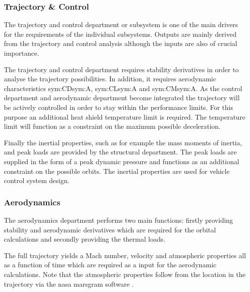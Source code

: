 \subsubsection{Trajectory \& Control}
The trajectory and control department or subsystem is one of the main drivers for the requirements of the individual subsystems. Outputs are mainly derived from the trajectory and control analysis although the inputs are also of crucial importance. 

The trajectory and control department requires stability derivatives in order to analyse the trajectory possibilities. In addition, it requires aerodynamic characteristics \gls{sym:CD}\gls{sym:A}, \gls{sym:CL}\gls{sym:A} and \gls{sym:CM}\gls{sym:A}.
As the control department and aerodynamic department become integrated the trajectory will be actively controlled in order to stay within the performance limits. For this purpose an additional heat shield temperature limit is required. The temperature limit will function as a constraint on the maximum possible deceleration.

Finally the inertial properties, such as for example the mass moments of inertia, and peak loads are provided by the structural department. The peak loads are supplied in the form of a peak dynamic pressure and functions as an additional constraint on the possible orbits. The inertial properties are used for vehicle control system design.

\subsubsection{Aerodynamics}
The aerodynamics department performs two main functions: firstly providing stability and aerodynamic derivatives which are required for the orbital calculations and secondly providing the thermal loads. %

The full trajectory yields a Mach number, velocity and atmospheric properties all as a function of time which are required as a input for the aerodynamic calculations. Note that the atmospheric properties follow from the location in the trajectory via the \gls{nasa} \gls{marsgram} software \cite{Justus2001}.

